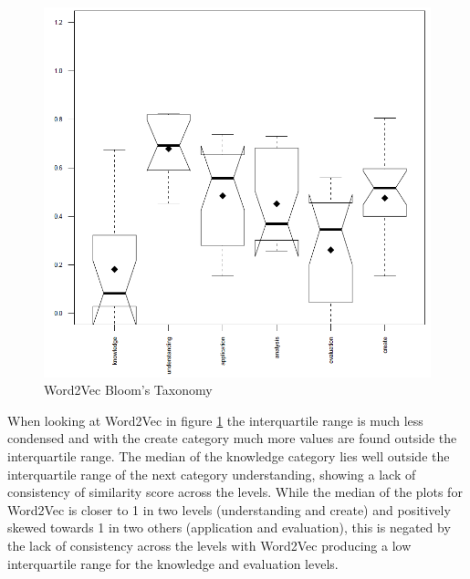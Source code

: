 \begin{figure}[H]
\centering
  \includegraphics[width=\textwidth]{images/w2v_bloom.PNG}
  \caption{Word2Vec Bloom's Taxonomy}
  \label{fig:bloom_w2v}
\end{figure}

\noindent
When looking at Word2Vec in figure \ref{fig:bloom_w2v} the interquartile range is much less condensed and with the create category much more values are found outside the interquartile range. The median of the knowledge category lies well outside the interquartile range of the next category understanding, showing a lack of consistency of similarity score across the levels. While the median of the plots for Word2Vec is closer to 1 in two levels (understanding and create) and positively skewed towards 1 in two others (application and evaluation), this is negated by the lack of consistency across the levels with Word2Vec producing a low interquartile range for the knowledge and evaluation levels.

